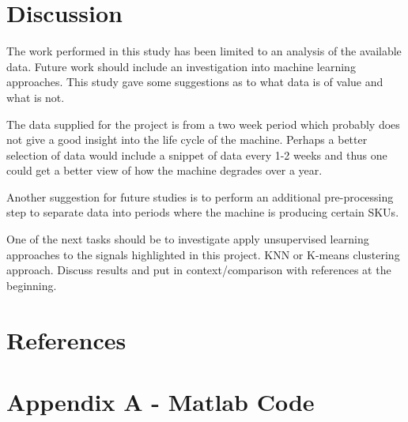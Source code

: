 \documentclass{article}
\begin{document}
\section{Discussion}
The work performed in this study has been limited to an analysis of the available data. Future work should include an investigation into machine learning approaches.
This study gave some suggestions as to what data is of value and what is not.

The data supplied for the project is from a two week period which probably does not give a good insight into the life cycle of the machine. Perhaps a better selection of data would include a snippet of data every 1-2 weeks and thus one could get a better view of how the machine degrades over a year.

Another suggestion for future studies is to perform an additional pre-processing step to separate data into periods where the machine is producing certain SKUs.

One of the next tasks should be to investigate apply unsupervised learning approaches to the signals highlighted in this project.
KNN or
K-means clustering approach.
Discuss results and put in context/comparison with references at the beginning. 
\clearpage
\section{References} 
\printbibliography[heading=none] 
\clearpage  
\section{Appendix A - Matlab Code}
\UseRawInputEncoding


%
\end{document}
